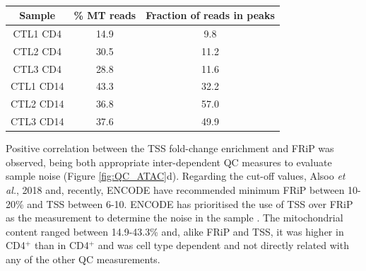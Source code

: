 \begin{table}[htbp]
\centering
\begin{tabular}{@{} c c c}
\toprule
\textbf{Sample} & \textbf{\% MT reads} & \textbf{Fraction of reads in peaks} \\
\midrule
\midrule
CTL1 CD4 & 14.9 & 9.8 \\
CTL2 CD4 & 30.5 & 11.2 \\
CTL3 CD4 & 28.8 & 11.6 \\
CTL1 CD14 & 43.3 & 32.2 \\
CTL2 CD14 & 36.8 & 57.0 \\
CTL3 CD14 & 37.6 & 49.9 \\
\bottomrule
\end{tabular}
\medskip %
\caption[ATAC-seq percentage of MT reads and fraction of reads in called peaks]{\textbf{}}
\label{tab:ATAC_MT_fraction_reads_in_peaks}
\end{table}
\bigskip %


Positive correlation between the TSS fold-change enrichment and FRiP was observed, being both appropriate inter-dependent QC measures to evaluate sample noise (Figure \ref{fig:QC_ATAC}d). Regarding the cut-off values, Alsoo \textit{et al.}, 2018 and, recently, ENCODE have recommended minimum FRiP between 10-20\% and TSS between 6-10. ENCODE has prioritised the use of TSS over FRiP as the measurement to determine the noise in the sample \parencite{ENCODE}. The mitochondrial content ranged between 14.9-43.3\% and, alike FRiP and TSS, it was higher in CD4$^+$ than in CD4$^+$ and was cell type dependent and not directly related with any of the other QC measurements.



